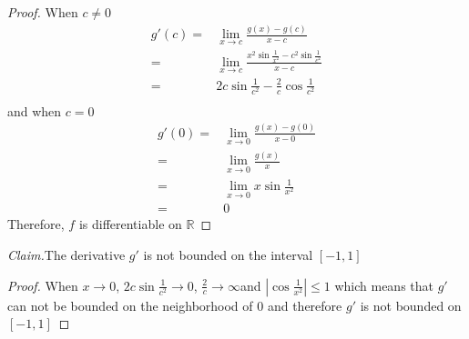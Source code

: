 \documentclass{article}
\newenvironment{claim}[1]{\par\noindent\textit{Claim.}\space#1}{}
\begin{document}
    \section{}
        \begin{proof}
            When $c\neq 0$
            \begin{equation*}
                \begin{split}
                    g'(c)=&\lim_{x\rightarrow c}\frac{g(x)-g(c)}{x-c}\\
                        =&\lim_{x\rightarrow c} \frac{x^2\sin\frac{1}{x^2}-c^2\sin\frac{1}{c^2}}{x-c}\\
                        =&2c\sin\frac{1}{c^2}-\frac{2}{c}\cos\frac{1}{c^2}\\
                \end{split}
            \end{equation*}
            and when $c=0$
            \begin{equation*}
                \begin{split}
                    g'(0)=&\lim_{x\rightarrow 0}\frac{g(x)-g(0)}{x-0}\\
                        =&\lim_{x\rightarrow 0}\frac{g(x)}{x}\\
                        =&\lim_{x\rightarrow 0}x\sin\frac{1}{x^2}\\
                        =&0
                \end{split}
            \end{equation*}
            Therefore, $f$ is differentiable on $\mathbb{R}$
        \end{proof}
        \begin{claim}
            The derivative $g'$ is not bounded on the interval $[-1,1]$
        \end{claim}
        \begin{proof}
            When $x\rightarrow 0$, $2c\sin \frac{1}{c^2}\rightarrow 0$, $\frac{2}{c}\rightarrow \infty$and $|\cos \frac{1}{x^2}|\leq 1$ which means that $g'$ can not be bounded on the neighborhood of $0$ and therefore $g'$ is not bounded on $[-1,1]$
        \end{proof}
\end{document}
